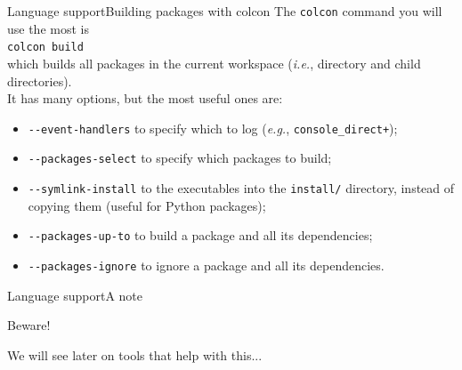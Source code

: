 \begin{frame}{Language support}{Building packages with colcon}
  The \texttt{colcon} command you will use the most is\\
  \bigskip
  \texttt{colcon build}\\
  \bigskip
  which builds all packages in the current workspace (\emph{i.e.}, directory and child directories).\\
  It has many options, but the most useful ones are:
  \begin{itemize}
    \item \texttt{-{}-event-handlers} to specify which  to log (\emph{e.g.}, \texttt{console\_direct+});
    \item \texttt{-{}-packages-select} to specify which packages to build;
    \item \texttt{-{}-symlink-install} to  the executables into the \texttt{install/} directory, instead of copying them (useful for Python packages);
    \item \texttt{-{}-packages-up-to} to build a package and all its dependencies;
    \item \texttt{-{}-packages-ignore} to ignore a package and all its dependencies.
  \end{itemize}
\end{frame}
\begin{frame}{Language support}{A note}
  \begin{alertblock}{Beware!}
    \centering
  \end{alertblock}
  \bigskip
  We will see later on tools that help with this...
\end{frame}

